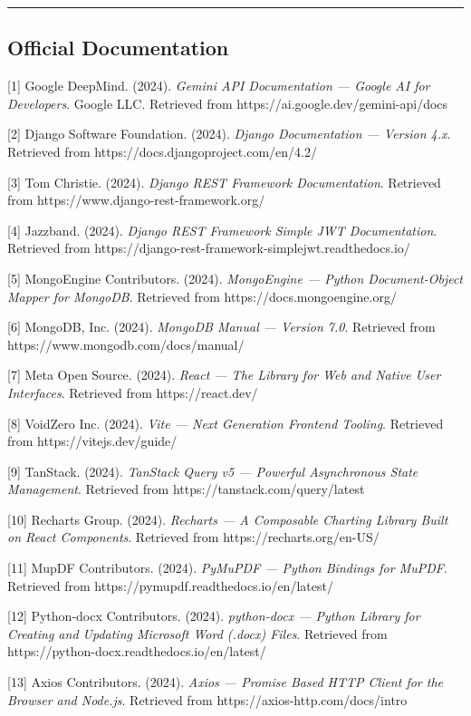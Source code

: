 \documentclass[12pt]{article}
\begin{document}
\noindent\rule{\textwidth}{0.4pt}

\subsection{Official Documentation}

[1] Google DeepMind. (2024). \textit{Gemini API Documentation — Google AI for Developers}. Google LLC. Retrieved from https://ai.google.dev/gemini-api/docs

[2] Django Software Foundation. (2024). \textit{Django Documentation — Version 4.x}. Retrieved from https://docs.djangoproject.com/en/4.2/

[3] Tom Christie. (2024). \textit{Django REST Framework Documentation}. Retrieved from https://www.django-rest-framework.org/

[4] Jazzband. (2024). \textit{Django REST Framework Simple JWT Documentation}. Retrieved from https://django-rest-framework-simplejwt.readthedocs.io/

[5] MongoEngine Contributors. (2024). \textit{MongoEngine — Python Document-Object Mapper for MongoDB}. Retrieved from https://docs.mongoengine.org/

[6] MongoDB, Inc. (2024). \textit{MongoDB Manual — Version 7.0}. Retrieved from https://www.mongodb.com/docs/manual/

[7] Meta Open Source. (2024). \textit{React — The Library for Web and Native User Interfaces}. Retrieved from https://react.dev/

[8] VoidZero Inc. (2024). \textit{Vite — Next Generation Frontend Tooling}. Retrieved from https://vitejs.dev/guide/

[9] TanStack. (2024). \textit{TanStack Query v5 — Powerful Asynchronous State Management}. Retrieved from https://tanstack.com/query/latest

[10] Recharts Group. (2024). \textit{Recharts — A Composable Charting Library Built on React Components}. Retrieved from https://recharts.org/en-US/

[11] MupDF Contributors. (2024). \textit{PyMuPDF — Python Bindings for MuPDF}. Retrieved from https://pymupdf.readthedocs.io/en/latest/

[12] Python-docx Contributors. (2024). \textit{python-docx — Python Library for Creating and Updating Microsoft Word (.docx) Files}. Retrieved from https://python-docx.readthedocs.io/en/latest/

[13] Axios Contributors. (2024). \textit{Axios — Promise Based HTTP Client for the Browser and Node.js}. Retrieved from https://axios-http.com/docs/intro
\end{document}
